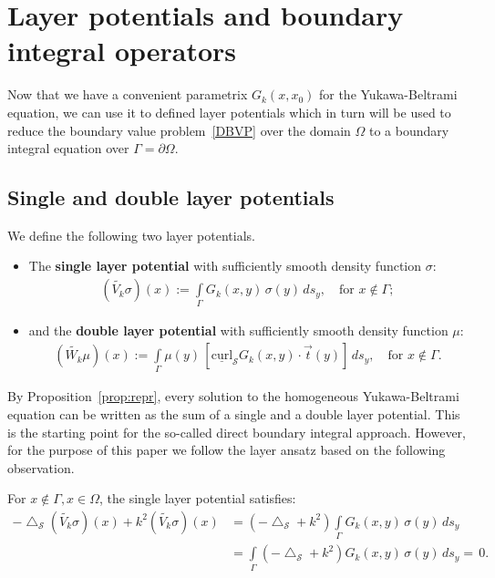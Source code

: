 \documentclass[final]{siamltex}
\newcommand{\lap}{\bigtriangleup}
\renewcommand{\S} {\mathcal{S}}
\begin{document}
\section{Layer potentials and boundary integral operators}
Now that we have a convenient parametrix $G_k(x,x_0)$ for the
Yukawa-Beltrami equation, we can use it to defined layer potentials
which in turn will be used to reduce the boundary value
problem~\eqref{DBVP}  over the domain $\Omega$ to a boundary integral
equation over $\Gamma = \partial \Omega$.


\subsection{Single and double layer potentials}
We define the following two layer potentials.
\begin{itemize}
\item The {\bf single layer potential} with sufficiently smooth density function $\sigma$:
  \begin{align*}
    (\widetilde{V_k}\sigma)(x):=\int\limits_{\Gamma}
    G_k(x,y)\,\sigma(y)\,ds_y,\quad\mbox{for $x \notin \Gamma$};
  \end{align*}
\item and the {\bf double layer potential} with sufficiently smooth density function $\mu$:
  \begin{align*}
    (\widetilde{W_k}\mu )(x):=\int\limits_{\Gamma}
    \mu(y)\,[\underline{\mbox{curl}}_{\S} G_k(x,y)\cdot \vec{t}(y)]\,
    ds_y, \quad\mbox{for $x\notin\Gamma$}.
  \end{align*}
\end{itemize}
By Proposition~\ref{prop:repr}, every solution to the homogeneous
Yukawa-Beltrami equation can be written as the sum of a single and a
double layer potential.  This  is the starting point for the so-called
direct boundary integral approach. However, for the purpose of this
paper we follow the layer ansatz based on the following observation.

For $x\notin\Gamma, x\in \Omega$, the single layer potential satisfies:
\begin{align*}
-\lap_{\S} (\widetilde{V_k}\sigma)(x)+k^2  (\widetilde{V_k}\sigma)(x)& =
(-\lap_{\S} + k^2)
\int\limits_\Gamma G_k(x,y)\, \sigma(y)\,ds_{y} \\
& = \int\limits_\Gamma (-\lap_{\S}+k^2) G_k(x,y)\, \sigma(y)\,ds_{y}
=  \, 0.
\end{align*}
\end{document}
